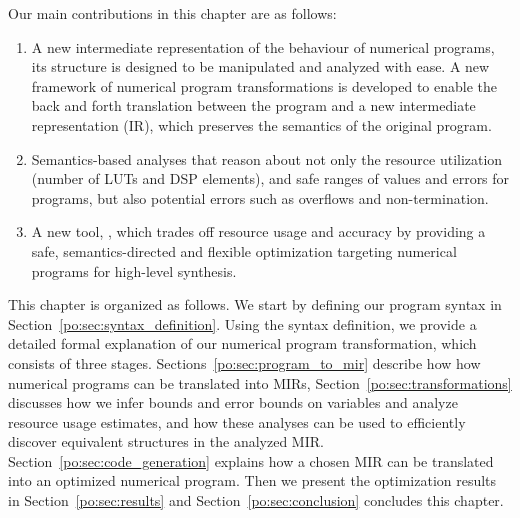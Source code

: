 
Our main contributions in this chapter are as follows:
\begin{enumerate}
    \vspace{-6pt}
    \item
        A new intermediate representation of the behaviour of numerical
        programs, its structure is designed to be manipulated and analyzed
        with ease.  A new framework of numerical program transformations is
        developed to enable the back and forth translation between the program
        and a new intermediate representation (IR), which preserves the
        semantics of the original program.
    \vspace{-6pt}
    \item
        Semantics-based analyses that reason about not only the resource
        utilization (number of LUTs and DSP elements), and safe ranges of
        values and errors for programs, but also potential errors such as
        overflows and non-termination.
    \vspace{-6pt}
    \item
        A new tool, \newsoap, which trades off resource usage and accuracy
        by providing a safe, semantics-directed and flexible optimization
        targeting numerical programs for high-level synthesis.
    \vspace{-6pt}
\end{enumerate}

This chapter is organized as follows.  We start by defining our program syntax
in Section~\ref{po:sec:syntax_definition}.  Using the syntax definition, we
provide a detailed formal explanation of our numerical program transformation,
which consists of three stages.  Sections~\ref{po:sec:program_to_mir}
describe how how numerical programs can be translated into MIRs,
Section~\ref{po:sec:transformations} discusses how we infer bounds and
error bounds on variables and analyze resource usage estimates, and how
these analyses can be used to efficiently discover equivalent structures
in the analyzed MIR\@.  Section~\ref{po:sec:code_generation} explains how
a chosen MIR can be translated into an optimized numerical program.  Then
we present the optimization results in Section~\ref{po:sec:results} and
Section~\ref{po:sec:conclusion} concludes this chapter.
